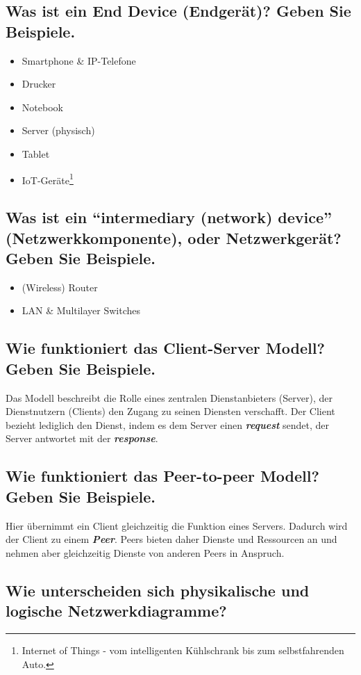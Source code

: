 \subsection*{Was ist ein \flqq End Device\frqq{} (Endgerät)? Geben Sie Beispiele.}
\begin{itemize}
    \item Smartphone \& IP-Telefone
    \item Drucker
    \item Notebook
    \item Server (physisch)
    \item Tablet
    \item IoT-Geräte\footnote{Internet of Things - vom intelligenten Kühlschrank bis zum selbstfahrenden Auto.}
\end{itemize}
\subsection*{Was ist ein ``intermediary (network) device'' (Netzwerkkomponente), oder Netzwerkgerät? Geben Sie Beispiele.}
\begin{itemize}
    \item (Wireless) Router
    \item LAN \& Multilayer Switches
\end{itemize}
\subsection*{Wie funktioniert das \flqq Client-Server\frqq{} Modell? Geben Sie Beispiele.}
Das Modell beschreibt die Rolle eines zentralen Dienstanbieters (Server), der Dienstnutzern (Clients) den Zugang zu seinen Diensten verschafft. Der Client bezieht lediglich den Dienst, indem es dem Server einen \textsl{\textbf{request}} sendet, der Server antwortet mit der \textsl{\textbf{response}}.
\subsection*{Wie funktioniert das \flqq Peer-to-peer\frqq{} Modell? Geben Sie Beispiele.}
Hier übernimmt ein Client gleichzeitig die Funktion eines Servers. Dadurch wird der Client zu einem \textsl{\textbf{Peer}}. Peers bieten daher Dienste und Ressourcen an und nehmen aber gleichzeitig Dienste von anderen Peers in Anspruch.
\subsection*{Wie unterscheiden sich physikalische und logische Netzwerkdiagramme?}
